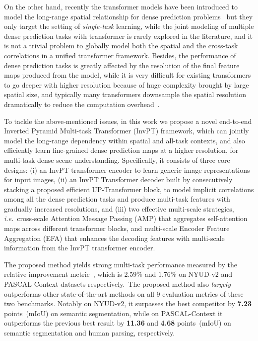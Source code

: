 \documentclass[runningheads]{llncs}
\newcommand*{\ie}{\emph{i.e.}}
\begin{document}
\par On the other hand, recently the transformer models have been introduced to model the long-range spatial relationship for dense prediction problems~\cite{dpt,hrformer} but they only target the setting of \emph{single-task} learning, while the joint modeling of multiple dense prediction tasks with transformer is rarely explored in the literature, and it is not a trivial problem to globally model both the spatial and the cross-task correlations in a unified transformer framework. Besides, the performance of dense prediction tasks is greatly affected by the resolution of the final feature maps produced from the model, while it is very difficult for existing transformers to go deeper with higher resolution because of huge complexity brought by large spatial size, and typically many transformers downsample the spatial resolution dramatically to reduce the computation overhead~\cite{vit,pvt}.


\par To tackle the above-mentioned issues, in this work we propose a novel end-to-end Inverted Pyramid Multi-task Transformer (InvPT) framework, which can jointly model the long-range dependency within spatial and all-task contexts, and also efficiently learn fine-grained dense prediction maps at a higher resolution, for multi-task dense scene understanding. Specifically, it consists of three core designs: (i) an InvPT transformer encoder to learn generic image representations for input images, (ii) an InvPT Transformer decoder built by consecutively stacking a proposed efficient UP-Transformer block, to model implicit correlations among all the dense prediction tasks and produce multi-task features with gradually increased resolutions, and (iii) two effective multi-scale strategies, \ie~cross-scale Attention Message Passing (AMP) that aggregates self-attention maps across different transformer blocks, and multi-scale Encoder Feature Aggregation (EFA) that {enhances the decoding features with multi-scale information from the InvPT transformer encoder}.
\par The proposed method yields strong multi-task performance measured by the relative improvement metric~\cite{astmt}, which is {$2.59\%$ and $1.76\%$} on NYUD-v2 and PASCAL-Context datasets respectively.~The proposed method also \emph{largely} outperforms other state-of-the-art methods on all 9 evaluation metrics of these two benchmarks. Notably on NYUD-v2, it surpasses the best competitor by \textbf{7.23} {points}~(mIoU) on semantic segmentation, while on PASCAL-Context it outperforms the previous best result by \textbf{11.36} and \textbf{4.68} points~(mIoU) on semantic segmentation and human parsing, respectively.
\end{document}
